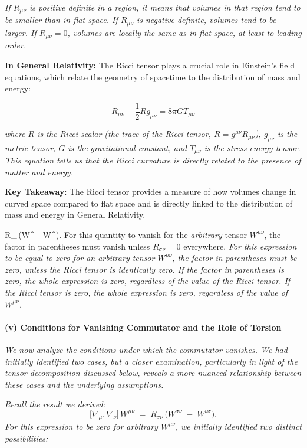 \textit{If \(R_{\mu\nu}\) is positive definite in a region, it means that volumes in that region tend to be smaller than in flat space. If \(R_{\mu\nu}\) is negative definite, volumes tend to be larger. If \(R_{\mu\nu} = 0\), volumes are locally the same as in flat space, at least to leading order.}

\textbf{In General Relativity:} The Ricci tensor plays a crucial role in Einstein's field equations, which relate the geometry of spacetime to the distribution of mass and energy:

\[
R_{\mu\nu} - \frac{1}{2} R g_{\mu\nu} = 8\pi G T_{\mu\nu}
\]

\textit{where \(R\) is the Ricci scalar (the trace of the Ricci tensor, \(R = g^{\mu\nu}R_{\mu\nu}\)), \(g_{\mu\nu}\) is the metric tensor, \(G\) is the gravitational constant, and \(T_{\mu\nu}\) is the stress-energy tensor. This equation tells us that the Ricci curvature is directly related to the presence of matter and energy.}

\textbf{Key Takeaway}: The Ricci tensor provides a measure of how volumes change in curved space compared to flat space and is directly linked to the distribution of mass and energy in General Relativity.

\pagebreak

R_{\sigma\nu}\,\bigl(W^{\sigma\nu} \;-\; W^{\nu\sigma}\bigr).
\]
For this quantity to vanish for the \emph{arbitrary} tensor $W^{\mu\nu}$, the factor in parentheses must vanish unless $R_{\sigma\nu}=0$ everywhere.
\textit{For this expression to be equal to zero for an arbitrary tensor \(W^{\mu\nu}\), the factor in parentheses must be zero, unless the Ricci tensor is identically zero. If the factor in parentheses is zero, the whole expression is zero, regardless of the value of the Ricci tensor. If the Ricci tensor is zero, the whole expression is zero, regardless of the value of \(W^{\mu\nu}\).}

\paragraph{(v) Conditions for Vanishing Commutator and the Role of Torsion}
\textit{We now analyze the conditions under which the commutator vanishes. We had initially identified two cases, but a closer examination, particularly in light of the tensor decomposition discussed below, reveals a more nuanced relationship between these cases and the underlying assumptions.}

\textit{Recall the result we derived:}
\[
\bigl[\nabla_{\mu}, \nabla_{\nu}\bigr]\,W^{\mu\nu} \;=\;
R_{\sigma\nu}\,\bigl(W^{\sigma\nu} \;-\; W^{\nu\sigma}\bigr).
\]
\textit{For this expression to be zero for arbitrary \(W^{\mu\nu}\), we initially identified two distinct possibilities:}

